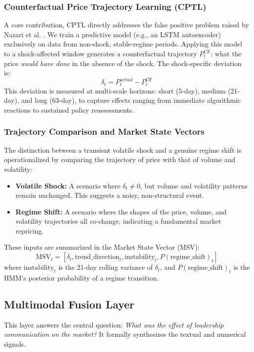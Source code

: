 \documentclass[11pt]{article}
\begin{document}
\subsubsection{Counterfactual Price Trajectory Learning (CPTL)}
A core contribution, CPTL directly addresses the false positive problem raised by Nazari et al. \cite{nazari2025}. We train a predictive model (e.g., an LSTM autoencoder) exclusively on data from non-shock, stable-regime periods. Applying this model to a shock-affected window generates a counterfactual trajectory $P_t^{\text{CF}}$: what the price \textit{would have done} in the absence of the shock. The shock-specific deviation is:
\begin{equation}
\delta_t = P_t^{\text{actual}} - P_t^{\text{CF}}
\label{eq:cptl}
\end{equation}
This deviation is measured at multi-scale horizons: short (5-day), medium (21-day), and long (63-day), to capture effects ranging from immediate algorithmic reactions to sustained policy reassessments.

\subsubsection{Trajectory Comparison and Market State Vectors}
The distinction between a transient volatile shock and a genuine regime shift is operationalized by comparing the trajectory of price with that of volume and volatility:
\begin{itemize}[leftmargin=*, itemsep=0pt, topsep=4pt]
    \item \textbf{Volatile Shock:} A scenario where $\delta_t \neq 0$, but volume and volatility patterns remain unchanged. This suggests a noisy, non-structural event.
    \item \textbf{Regime Shift:} A scenario where the shapes of the price, volume, and volatility trajectories all co-change, indicating a fundamental market repricing.
\end{itemize}
These inputs are summarized in the Market State Vector (MSV):
\begin{equation}
\text{MSV}_t = [\delta_t, \text{trend\_direction}_t, \text{instability}_t, P(\text{regime\_shift})_t]
\label{eq:msv}
\end{equation}
where $\text{instability}_t$ is the 21-day rolling variance of $\delta_t$, and $P(\text{regime\_shift})_t$ is the HMM’s posterior probability of a regime transition.

\subsection{Multimodal Fusion Layer}
This layer answers the central question: \textit{What was the effect of leadership communication on the market?} It formally synthesizes the textual and numerical signals.
\end{document}
